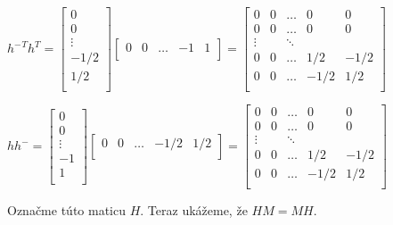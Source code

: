 \begin{dokaz}
\begin{center}
$
{h^-}^T h^T = 
\begin{bmatrix}
0 \\
0 \\
\vdots \\
-1/2 \\
1/2 \\
\end{bmatrix}
\begin{bmatrix}
0 & 0 & \ldots & -1 & 1 \\
\end{bmatrix}
=
\begin{bmatrix}
0 & 0 & \ldots & 0 & 0 \\
0 & 0 & \ldots & 0 & 0 \\
\vdots && \ddots \\
0 & 0 & \ldots & 1/2 & -1/2 \\
0 & 0 & \ldots & -1/2 & 1/2 \\
\end{bmatrix}
$
\end{center}

\begin{center}
$
h h^- = 
\begin{bmatrix}
0 \\
0 \\
\vdots \\
-1 \\
1 \\
\end{bmatrix}
\begin{bmatrix}
0 & 0 & \ldots & -1/2 & 1/2 \\
\end{bmatrix}
=
\begin{bmatrix}
0 & 0 & \ldots & 0 & 0 \\
0 & 0 & \ldots & 0 & 0 \\
\vdots && \ddots \\
0 & 0 & \ldots & 1/2 & -1/2 \\
0 & 0 & \ldots & -1/2 & 1/2 \\
\end{bmatrix}
$
\end{center}

Označme túto maticu $H$. Teraz ukážeme, že $HM = MH$.


\end{dokaz}
